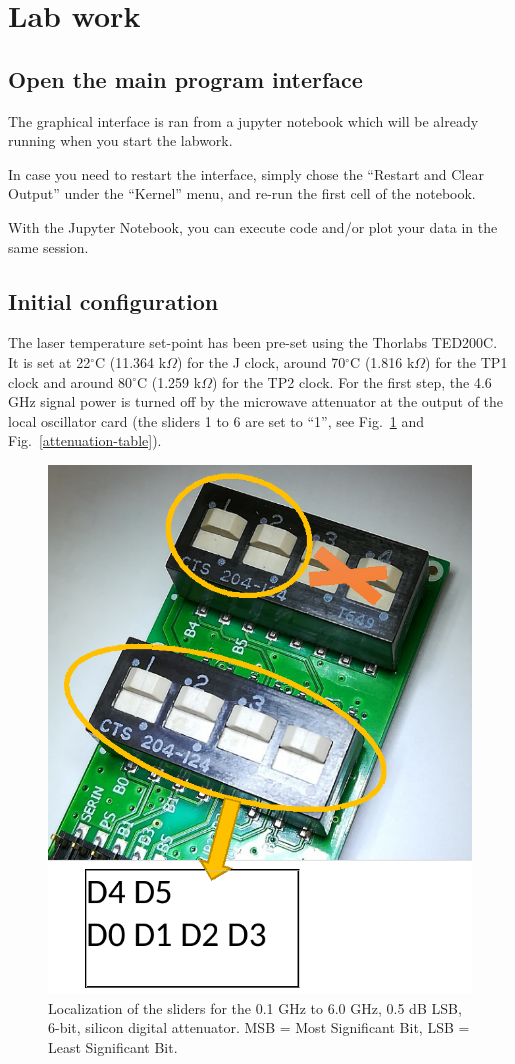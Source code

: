 \documentclass[a4paper,11pt]{article}
\begin{document}
\section{Lab work}
\subsection{Open the main program interface}
The graphical interface is ran from a jupyter notebook which will be already running when you start the labwork. 

In case you need to restart the interface, simply chose the “Restart and Clear Output” under the “Kernel” menu, and re-run the first cell of the notebook.

With the Jupyter Notebook, you can execute code and/or plot your data in the same session.

\subsection{Initial configuration}
The laser temperature set-point has been pre-set using the Thorlabs TED200C. It is set at 22$^\circ$C (11.364 k$\Omega$) for the J clock, around 70$^\circ$C (1.816 k$\Omega$) for the TP1 clock and around 80$^\circ$C (1.259 k$\Omega$) for the TP2 clock.
For the first step, the 4.6 GHz signal power is turned off by the microwave attenuator at the output of the local oscillator card (the sliders 1 to 6 are set to “1”, see Fig.~\ref{fig:attenuation} and Fig.~\ref{attenuation-table}).



\begin{figure}[h!]
	\centering
	\includegraphics[width=0.5\linewidth]{attenuation}
	\caption{Localization of the sliders for the 0.1 GHz to 6.0 GHz, 0.5 dB LSB, 6-bit, silicon digital attenuator. MSB = Most Significant Bit, LSB = Least Significant Bit.}
	\label{fig:attenuation}
\end{figure}
\end{document}
